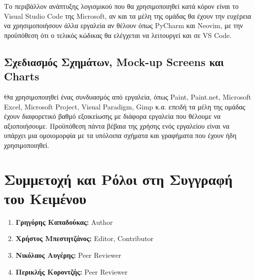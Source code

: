 \documentclass[12pt,a4paper]{article}
\begin{document}
Το περιβάλλον ανάπτυξης λογισμικού που θα χρησιμοποιηθεί κατά κόρον είναι το Visual Studio Code της Microsoft, αν και τα μέλη της ομάδας θα έχουν την ευχέρεια να χρησιμοποιήσουν άλλα εργαλεία αν θέλουν όπως PyCharm και Neovim, με την προϋπόθεση ότι ο τελικός κώδικας θα ελέγχεται να λειτουργεί και σε VS Code.

\subsection{Σχεδιασμός Σχημάτων, Mock-up Screens και Charts}
Θα χρησιμοποιηθεί ένας συνδυασμός από εργαλεία, όπως Paint, Paint.net, Microsoft Excel, Microsoft Project, Visual Paradigm, Gimp κ.α. επειδή τα μέλη της ομάδας έχουν διαφορετικό βαθμό εξοικείωσης με διάφορα εργαλεία που θέλουμε να αξιοποιήσουμε. Προϋπόθεση πάντα βέβαια της χρήσης ενός εργαλείου είναι να υπάρχει μια ομοιομορφία με τα υπόλοιπα σχήματα και γραφήματα που έχουν ήδη χρησιμοποιηθεί.

\section{Συμμετοχή και Ρόλοι στη Συγγραφή του Κειμένου}
\begin{enumerate}
	\item \textbf{Γρηγόρης Καπαδούκας:} Author
	\item \textbf{Χρήστος Μπεστητζάνος:} Editor, Contributor
	\item \textbf{Νικόλαος Αυγέρης:} Peer Reviewer
	\item \textbf{Περικλής Κοροντζής:} Peer Reviewer
\end{enumerate}
\end{document}
